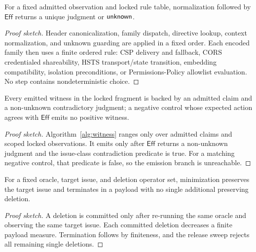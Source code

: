\begin{theorem}
For a fixed admitted observation and locked rule table, normalization followed by $\mathsf{Eff}$ returns a unique judgment or $\mathsf{unknown}$.
\end{theorem}
\begin{proof}[Proof sketch]
Header canonicalization, family dispatch, directive lookup, context normalization, and unknown guarding are applied in a fixed order. Each encoded family then uses a finite ordered rule: CSP delivery and fallback, CORS credentialed shareability, HSTS transport/state transition, embedding compatibility, isolation preconditions, or Permissions-Policy allowlist evaluation. No step contains nondeterministic choice.
\end{proof}

\begin{theorem}
Every emitted witness in the locked fragment is backed by an admitted claim and a non-unknown contradictory judgment; a negative control whose expected action agrees with $\mathsf{Eff}$ emits no positive witness.
\end{theorem}
\begin{proof}[Proof sketch]
Algorithm~\ref{alg:witness} ranges only over admitted claims and scoped locked observations. It emits only after $\mathsf{Eff}$ returns a non-unknown judgment and the issue-class contradiction predicate is true. For a matching negative control, that predicate is false, so the emission branch is unreachable.
\end{proof}

\begin{theorem}
For a fixed oracle, target issue, and deletion operator set, minimization preserves the target issue and terminates in a payload with no single additional preserving deletion.
\end{theorem}
\begin{proof}[Proof sketch]
A deletion is committed only after re-running the same oracle and observing the same target issue. Each committed deletion decreases a finite payload measure. Termination follows by finiteness, and the release sweep rejects all remaining single deletions.
\end{proof}
